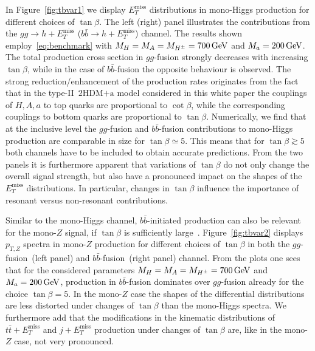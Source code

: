 \documentclass[a4paper, 11pt,notoc]{article}
\newcommand{\MET}{\ensuremath{E_T^\mathrm{miss}}\xspace}
\newcommand{\mA}{\ensuremath{M_{A}}\xspace}
\newcommand{\ma}{\ensuremath{M_{a}}\xspace}
\newcommand{\mH}{\ensuremath{M_{H}}\xspace}
\newcommand{\mHc}{\ensuremath{M_{H^{\pm}}}\xspace}
\newcommand{\hdma}{\ensuremath{\textrm{2HDM+a}}\xspace}
\begin{document}
In Figure~\ref{fig:tbvar1} we display $\MET$ distributions in mono-Higgs production for different choices of $\tan \beta$. The left (right) panel illustrates the contributions from the $gg \to h + \MET$ ($b \bar b \to h + \MET$) channel. The  results shown employ~\eqref{eq:benchmark} with $\mH = \mA = \mHc = 700 \, {\rm GeV}$ and $\ma = 200 \, {\rm GeV}$. The total production cross section in $gg$-fusion strongly decreases with increasing $\tan \beta$, while in the case of $b \bar b$-fusion the opposite behaviour is observed. The strong reduction/enhancement of the production rates originates from the fact that in  the type-II~\hdma model considered in this white paper the couplings of $H,A,a$ to top quarks are proportional to $\cot \beta$, while the corresponding couplings to bottom quarks are proportional to $\tan \beta$. Numerically, we find that at the inclusive level the $gg$-fusion and $b\bar b$-fusion contributions to mono-Higgs production are comparable in size for $\tan \beta \simeq 5$. This means that for $\tan \beta \gtrsim 5$ both channels have to be included to obtain accurate predictions. From the two panels it is furthermore apparent that variations of $\tan \beta$ do not only change the overall signal strength, but also have a pronounced impact on the shapes of the $\MET$ distributions. In particular, changes in $\tan \beta$ influence the importance of resonant versus non-resonant contributions. 

 Similar to the mono-Higgs channel, $b \bar b$-initiated production can also be relevant for the mono-$Z$ signal,  if $\tan \beta$ is sufficiently large~\cite{Bauer:2017ota}. Figure~\ref{fig:tbvar2} displays $p_{T,Z}$ spectra in mono-$Z$ production for different choices of $\tan \beta$ in both the $gg$-fusion~(left panel) and $b \bar b$-fusion~(right panel) channel.  From the plots one sees that for the considered parameters $\mH = \mA = \mHc = 700 \, {\rm GeV}$ and $\ma = 200 \, {\rm GeV}$,  production in $b \bar b$-fusion dominates over $gg$-fusion already for the choice $\tan \beta = 5$. In the mono-$Z$ case   the shapes of the differential distributions are less distorted under changes of $\tan \beta$ than the mono-Higgs spectra. We furthermore  add that the modifications in the kinematic distributions of $t \bar t + \MET$ and $j +\MET$ production under changes of $\tan \beta$ are, like in the mono-$Z$ case, not very pronounced.
 
\end{document}
